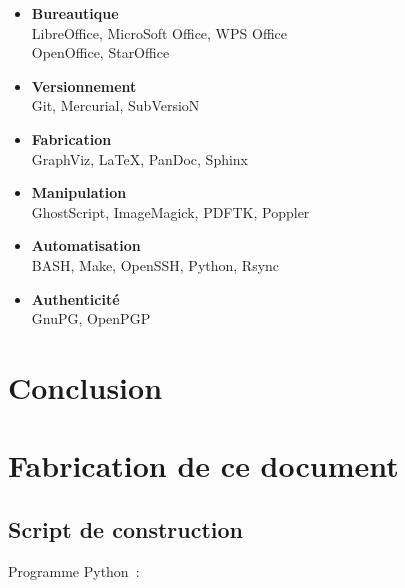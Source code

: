 \documentclass[12pt]{extarticle}
\begin{document}
\begin{itemize}
\item{\textbf{Bureautique}\\
LibreOffice, MicroSoft Office, WPS Office\\
OpenOffice, StarOffice}
\item{\textbf{Versionnement}\\
Git, Mercurial, SubVersioN}
\item{\textbf{Fabrication}\\
GraphViz, LaTeX, PanDoc, Sphinx}
\item{\textbf{Manipulation}\\
GhostScript, ImageMagick, PDFTK, Poppler}
\item{\textbf{Automatisation}\\
BASH, Make, OpenSSH, Python, Rsync}
\item{\textbf{Authenticité}\\
GnuPG, OpenPGP}
\end{itemize}

\pagebreak
\section{Conclusion}

\pagebreak
\printbibliography[heading=bibintoc,title=Bibliographie]

\pagebreak
\appendix
\section{Fabrication de ce document}



\subsection{Script de construction}

Programme Python :
\end{document}

